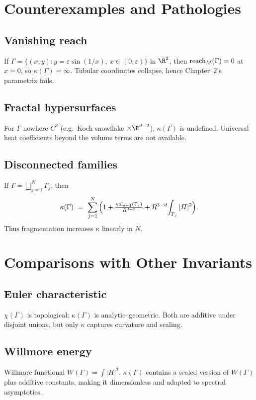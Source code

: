\section{Counterexamples and Pathologies}
\label{sec:counterexamples}

\subsection{Vanishing reach}
If $\Gamma=\{(x,y):y=\varepsilon\sin(1/x),\ x\in(0,\varepsilon)\}$ in $\R^2$, then $\operatorname{reach}_M(\Gamma)=0$ at $x=0$, so $\kappa(\Gamma)=\infty$. Tubular coordinates collapse, hence Chapter~2’s parametrix fails.

\subsection{Fractal hypersurfaces}
For $\Gamma$ nowhere $C^2$ (e.g.\ Koch snowflake $\times\R^{d-2}$), $\kappa(\Gamma)$ is undefined. Universal heat coefficients beyond the volume terms are not available.

\subsection{Disconnected families}
If $\Gamma=\bigsqcup_{j=1}^N \Gamma_j$, then
\[
\kappa(\Gamma)\ =\ \sum_{j=1}^N \Big(1+\tfrac{\operatorname{vol}_{d-1}(\Gamma_j)}{R^{d-1}}+R^{3-d}\!\int_{\Gamma_j}|H|^2\Big).
\]
Thus fragmentation increases $\kappa$ linearly in $N$.

\section{Comparisons with Other Invariants}
\label{sec:comparisons}

\subsection{Euler characteristic}
$\chi(\Gamma)$ is topological; $\kappa(\Gamma)$ is analytic–geometric. Both are additive under disjoint unions, but only $\kappa$ captures curvature and scaling.

\subsection{Willmore energy}
Willmore functional $W(\Gamma)=\int |H|^2$.  
$\kappa(\Gamma)$ contains a scaled version of $W(\Gamma)$ plus additive constants, making it dimensionless and adapted to spectral asymptotics.

